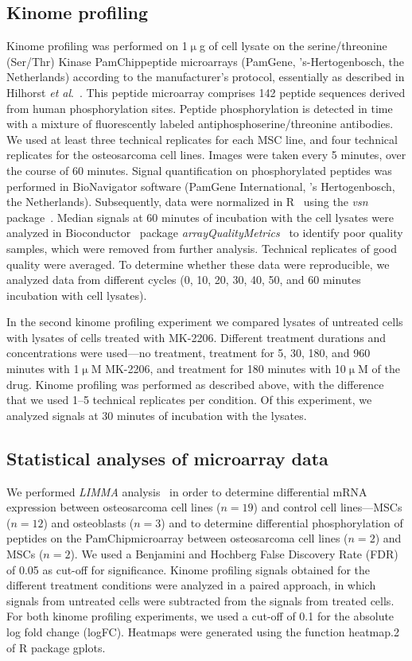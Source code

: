 \subsection{Kinome profiling}
Kinome profiling was performed on 1$\upmu$g of cell lysate on the serine/threonine (Ser/Thr) Kinase PamChip\textregistered peptide microarrays (PamGene, 's-Hertogenbosch, the Netherlands) according to the manufacturer's protocol, essentially as described in Hilhorst {\it et al}.~\cite{hilhorst2013peptide}. This peptide microarray comprises 142 peptide sequences derived from human phosphorylation sites. Peptide phosphorylation is detected in time with a mixture of fluorescently labeled antiphosphoserine/threonine antibodies. We used at least three technical replicates for each MSC line, and four technical replicates for the osteosarcoma cell lines. Images were taken every 5 minutes, over the course of 60 minutes. Signal quantification on phosphorylated peptides was performed in BioNavigator software (PamGene International, 's Hertogenbosch, the Netherlands). Subsequently, data were normalized in R~\cite{smyth2004linear} using the {\it vsn} package~\cite{huber2002variance}. Median signals at 60 minutes of incubation with the cell lysates were analyzed in Bioconductor~\cite{gentleman2004bioconductor} package {\it arrayQualityMetrics}~\cite{kauffmann2009arrayqualitymetrics} to identify poor quality samples, which were removed from further analysis. Technical replicates of good quality were averaged. To determine whether these data were reproducible, we analyzed data from different cycles (0, 10, 20, 30, 40, 50, and 60 minutes incubation with cell lysates).

In the second kinome profiling experiment we compared lysates of untreated cells with lysates of cells treated with MK-2206. Different treatment durations and concentrations were used---no treatment, treatment for 5, 30, 180, and 960 minutes with 1$\upmu$M MK-2206, and treatment for 180 minutes with 10$\upmu$M of the drug. Kinome profiling was performed as described above, with the difference that we used 1--5 technical replicates per condition. Of this experiment, we analyzed signals at 30 minutes of incubation with the lysates.

\subsection{Statistical analyses of microarray data}
We performed {\it LIMMA} analysis~\cite{smyth2004linear} in order to determine differential mRNA expression between osteosarcoma cell lines ($n=19$) and control cell lines---MSCs ($n=12$) and osteoblasts ($n=3$) and to determine differential phosphorylation of peptides on the PamChip\textregistered microarray between osteosarcoma cell lines ($n=2$) and MSCs ($n=2$). We used a Benjamini and Hochberg False Discovery Rate (FDR) of 0.05 as cut-off for significance. Kinome profiling signals obtained for the different treatment conditions were analyzed in a paired approach, in which signals from untreated cells were subtracted from the signals from treated cells. For both kinome profiling experiments, we used a cut-off of 0.1 for the absolute log fold change (logFC). Heatmaps were generated using the function heatmap.2 of R package gplots.

